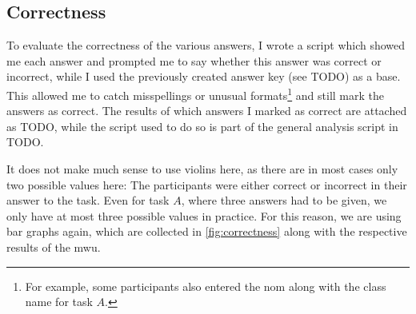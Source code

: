 \documentclass[../thesis]{subfiles}
\begin{document}
%

\subsection{Correctness}\label{subsec:correct}
To evaluate the correctness of the various answers, I wrote a script which showed me each answer and prompted me to say whether this answer was correct or incorrect, while I used the previously created answer key (see {TODO}) as a base.
This allowed me to catch misspellings or unusual formats\footnote{For example, some participants also entered the \gls{nom} along with the class name for task $A$.} and still mark the answers as correct.
The results of which answers I marked as correct are attached as {TODO}, while the script used to do so is part of the general analysis script in {TODO}.

It does not make much sense to use \glspl{violin} here, as there are in most cases only two possible values here:
The participants were either correct or incorrect in their answer to the task.
Even for task $A$, where three answers had to be given, we only have at most three possible values in practice.
For this reason, we are using bar graphs again, which are collected in \cref{fig:correctness} along with the respective results of the \gls{mwu}.
\end{document}
